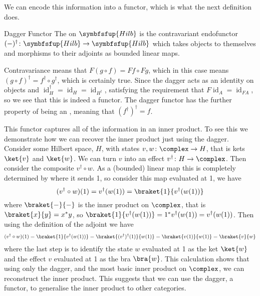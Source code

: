 \documentclass[fleqn]{NotesClass}
\makeatletter
\newcommand{\c@egory}[1]{\symbfsfup{#1}}
\newcommand{\Hilb}{\c@egory{Hilb}}
\DeclareMathOperator{\id}{id}
\newcommand{\hermit}{\dagger}
\makeatother
\begin{document}
    We can encode this information into a functor, which is what the next definition does.
    
    \begin{dfn}{Dagger Functor}{}
        The \index{dagger!Hilb@dagger!\(\Hilb\)} on \(\Hilb\) is the contravariant endofunctor \((-)^\dagger \colon \Hilb \to \Hilb\) which takes objects to themselves and morphisms to their adjoints as bounded linear maps.
    \end{dfn}
    
    Contravariance means that \(F(g \circ f) = Ff \circ Fg\), which in this case means \((g \circ f)^\dagger = f^\dagger \circ g^\dagger\), which is certainly true.
    Since the dagger acts as an identity on objects and \(\id_H^\dagger = \id_H = \id_{H^\dagger}\), satisfying the requirement that \(F\id_A = \id_{FA}\), so we see that this is indeed a functor.
    The dagger functor has the further property of being an , meaning that \((f^{\dagger})^{\dagger} = f\).
    
    This functor captures all of the information in an inner product.
    To see this we demonstrate how we can recover the inner product just using the dagger.
    Consider some Hilbert space, \(H\), with states \(v, w \colon \complex \to H\), that is kets \(\ket{v}\) and \(\ket{w}\).
    We can turn \(v\) into an effect \(v^\dagger \colon H \to \complex\).
    Then consider the composite \(v^\hermit \circ w\).
    As a (bounded) linear map this is completely determined by where it sends 1, so consider this map evaluated at 1, we have
    \begin{equation}
        (v^\dagger \circ w)(1) = v^\dagger(w(1)) = \braket{1}{v^\dagger(w(1))}
    \end{equation}
    where \(\braket{-}{-}\) is the inner product on \(\complex\), that is \(\braket{x}{y} = x^*y\), so \(\braket{1}{v^\dagger(w(1))} = 1^*v^\dagger(w(1)) = v^\dagger(w(1))\).
    Then using the definition of the adjoint we have
    \begin{equation}
        (v^\dagger \circ w)(1) = \braket{1}{v^\dagger(w(1))} = \braket{(v^\dagger)^\dagger(1)}{w(1)} = \braket{v(1)}{w(1)} = \braket{v}{w}
    \end{equation}
    where the last step is to identify the state \(w\) evaluated at 1 as the ket \(\ket{w}\) and the effect \(v\) evaluated at 1 as the bra \(\bra{w}\).
    This calculation shows that using only the dagger, and the most basic inner product on \(\complex\), we can reconstruct the inner product.
    This suggests that we can use the dagger, a functor, to generalise the inner product to other categories.
    
\end{document}

